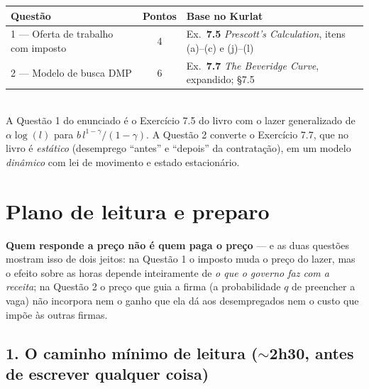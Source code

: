 \documentclass[11pt, a4paper]{article}
\begin{document}
\begin{center}
\small
\begin{tabular}{@{}lcl@{}}
\toprule
\textbf{Questão} & \textbf{Pontos} & \textbf{Base no Kurlat} \\
\midrule
1 --- Oferta de trabalho com imposto & 4 & Ex.\ \textbf{7.5} \emph{Prescott's Calculation}, itens (a)--(c) e (j)--(l) \\
2 --- Modelo de busca DMP & 6 & Ex.\ \textbf{7.7} \emph{The Beveridge Curve}, expandido; §7.5 \\
\bottomrule
\end{tabular}\\[3pt]
{\footnotesize A Questão 1 do enunciado é o Exercício 7.5 do livro com o lazer generalizado
de $\alpha\log(l)$ para $b\,l^{1-\gamma}/(1-\gamma)$. A Questão 2 converte o Exercício 7.7,
que no livro é \emph{estático} (desemprego ``antes'' e ``depois'' da contratação), em um
modelo \emph{dinâmico} com lei de movimento e estado estacionário.}
\end{center}

\section[Plano de leitura e preparo]{Plano de leitura e preparo}
\label{sec:plano}

\begin{tcolorbox}[planbox, title={A tese da lista, em uma frase}]
\small
\textbf{Quem responde a preço não é quem paga o preço} --- e as duas questões mostram isso
de dois jeitos: na Questão 1 o imposto muda o preço do lazer, mas o efeito sobre as horas
depende inteiramente de \emph{o que o governo faz com a receita}; na Questão 2 o preço que
guia a firma (a probabilidade $q$ de preencher a vaga) não incorpora nem o ganho que ela dá
aos desempregados nem o custo que impõe às outras firmas.
\end{tcolorbox}

\subsection*{1. O caminho mínimo de leitura ($\sim$2h30, antes de escrever qualquer coisa)}
\end{document}
